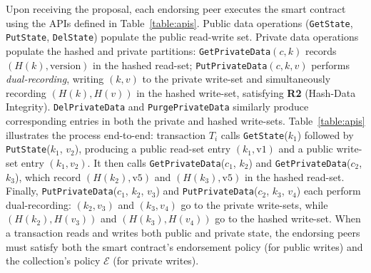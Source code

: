 Upon receiving the proposal, each endorsing peer executes the smart contract using the APIs defined in Table~\ref{table:apis}. Public data operations (\texttt{GetState}, \texttt{PutState}, \texttt{DelState}) populate the public read-write set. Private data operations populate the hashed and private partitions: \texttt{GetPrivateData}$(c, k)$ records $(H(k), \text{version})$ in the hashed read-set; \texttt{PutPrivateData}$(c, k, v)$ performs \textit{dual-recording}, writing $(k, v)$ to the private write-set and simultaneously recording $(H(k), H(v))$ in the hashed write-set, satisfying \textbf{R2} (Hash-Data Integrity). \texttt{DelPrivateData} and \texttt{PurgePrivateData} similarly produce corresponding entries in both the private and hashed write-sets. Table~\ref{table:apis} illustrates the process end-to-end: transaction $T_i$ calls \texttt{GetState}($k_1$) followed by \texttt{PutState}($k_1$, $v_2$), producing a public read-set entry $(k_1, \text{v1})$ and a public write-set entry $(k_1, v_2)$. It then calls \texttt{GetPrivateData}($c_1$, $k_2$) and \texttt{GetPrivateData}($c_2$, $k_3$), which record $(H(k_2), \text{v5})$ and $(H(k_3), \text{v5})$ in the hashed read-set. Finally, \texttt{PutPrivateData}($c_1$, $k_2$, $v_3$) and \texttt{PutPrivateData}($c_2$, $k_3$, $v_4$) each perform dual-recording: $(k_2, v_3)$ and $(k_3, v_4)$ go to the private write-sets, while $(H(k_2), H(v_3))$ and $(H(k_3), H(v_4))$ go to the hashed write-set. When a transaction reads and writes both public and private state, the endorsing peers must satisfy both the smart contract's endorsement policy (for public writes) and the collection's policy $\mathcal{E}$ (for private writes).

